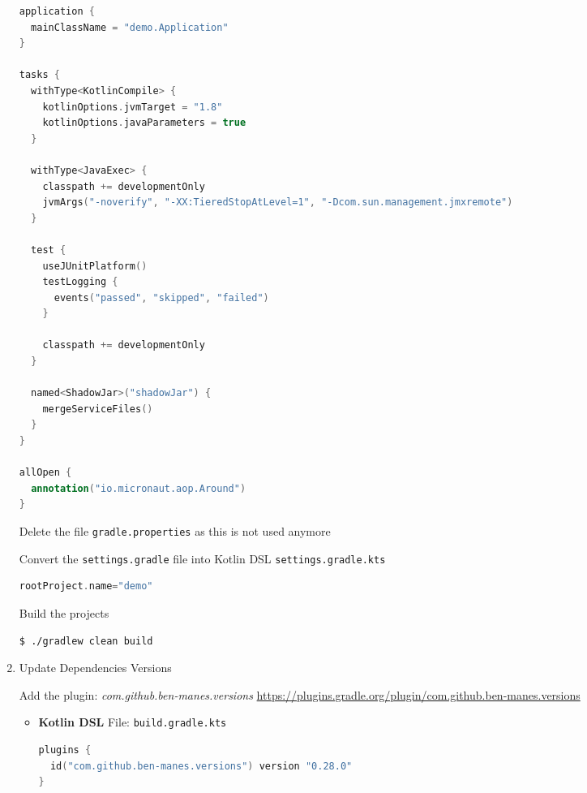 \documentclass[12pt, letterpaper]{article}
\begin{document}
\begin{enumerate}
\begin{lstlisting}[language=Kotlin]
application {
  mainClassName = "demo.Application"
}

tasks {
  withType<KotlinCompile> {
    kotlinOptions.jvmTarget = "1.8"
    kotlinOptions.javaParameters = true
  }

  withType<JavaExec> {
    classpath += developmentOnly
    jvmArgs("-noverify", "-XX:TieredStopAtLevel=1", "-Dcom.sun.management.jmxremote")
  }

  test {
    useJUnitPlatform()
    testLogging {
      events("passed", "skipped", "failed")
    }

    classpath += developmentOnly
  }

  named<ShadowJar>("shadowJar") {
    mergeServiceFiles()
  }
}

allOpen {
  annotation("io.micronaut.aop.Around")
}
	      \end{lstlisting}

	      Delete the file \texttt{gradle.properties} as this is not used anymore

	      Convert the \texttt{settings.gradle} file into Kotlin DSL \texttt{settings.gradle.kts}

	      \begin{lstlisting}[language=Kotlin]
rootProject.name="demo"
	      \end{lstlisting}

	      Build the projects

	      \begin{lstlisting}[language=bash]
$ ./gradlew clean build
	      \end{lstlisting}

	\item Update Dependencies Versions

	      Add the plugin: \textit{com.github.ben-manes.versions}
	      \newline
	      {\footnotesize \url{https://plugins.gradle.org/plugin/com.github.ben-manes.versions}}

	      \begin{itemize}

	      	\item[] \textbf{Kotlin DSL}
	      	      \newline
	      	      File: \texttt{build.gradle.kts}

	      	      \begin{lstlisting}[language=Kotlin]
plugins {
  id("com.github.ben-manes.versions") version "0.28.0"
}
	      	      \end{lstlisting}


\end{itemize}
\end{enumerate}
\end{document}
